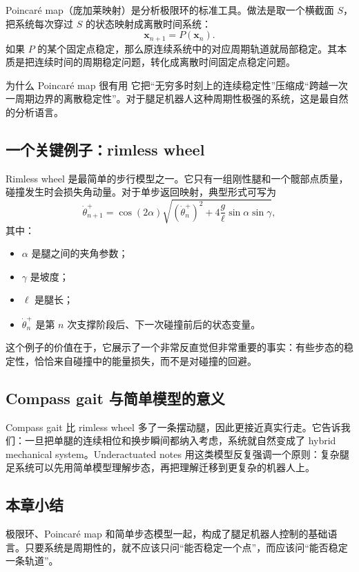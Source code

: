 \documentclass[a4paper]{article}
\newcommand{\bx}{\mathbf{x}}
\begin{document}
Poincar\'e map（庞加莱映射）是分析极限环的标准工具。做法是取一个横截面 $S$，把系统每次穿过 $S$ 的状态映射成离散时间系统：
\[
\bx_{n+1} = P(\bx_n).
\]
如果 $P$ 的某个固定点稳定，那么原连续系统中的对应周期轨道就局部稳定。其本质是把连续时间的周期稳定问题，转化成离散时间固定点稳定问题。

\begin{knowledgebox}{为什么 Poincar\'e map 很有用}
它把“无穷多时刻上的连续稳定性”压缩成“跨越一次一周期边界的离散稳定性”。对于腿足机器人这种周期性极强的系统，这是最自然的分析语言。
\end{knowledgebox}

\subsection{一个关键例子：rimless wheel}

Rimless wheel 是最简单的步行模型之一。它只有一组刚性腿和一个髋部点质量，碰撞发生时会损失角动量。对于单步返回映射，典型形式可写为
\[
\dot{\theta}^{+}_{n+1}
= \cos(2\alpha)\sqrt{(\dot{\theta}^{+}_n)^2 + 4\frac{g}{\ell}\sin\alpha\sin\gamma},
\]
其中：
\begin{itemize}
  \item $\alpha$ 是腿之间的夹角参数；
  \item $\gamma$ 是坡度；
  \item $\ell$ 是腿长；
  \item $\dot{\theta}^{+}_n$ 是第 $n$ 次支撑阶段后、下一次碰撞前后的状态变量。
\end{itemize}

这个例子的价值在于，它展示了一个非常反直觉但非常重要的事实：有些步态的稳定性，恰恰来自碰撞中的能量损失，而不是对碰撞的回避。

\subsection{Compass gait 与简单模型的意义}

Compass gait 比 rimless wheel 多了一条摆动腿，因此更接近真实行走。它告诉我们：一旦把单腿的连续相位和换步瞬间都纳入考虑，系统就自然变成了 hybrid mechanical system。Underactuated notes 用这类模型反复强调一个原则：复杂腿足系统可以先用简单模型理解步态，再把理解迁移到更复杂的机器人上。

\subsection{本章小结}

极限环、Poincar\'e map 和简单步态模型一起，构成了腿足机器人控制的基础语言。只要系统是周期性的，就不应该只问“能否稳定一个点”，而应该问“能否稳定一条轨道”。
\end{document}
